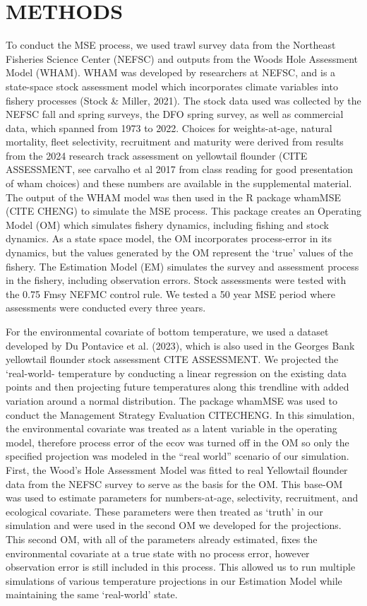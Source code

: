 \documentclass[
  12pt,
]{article}
\begin{document}
\section{METHODS}\label{methods}

To conduct the MSE process, we used trawl survey data from the Northeast Fisheries Science Center (NEFSC) and outputs from the Woods Hole Assessment Model (WHAM). WHAM was developed by researchers at NEFSC, and is a state-space stock assessment model which incorporates climate variables into fishery processes (Stock \& Miller, 2021). The stock data used was collected by the NEFSC fall and spring surveys, the DFO spring survey, as well as commercial data, which spanned from 1973 to 2022. Choices for weights-at-age, natural mortality, fleet selectivity, recruitment and maturity were derived from results from the 2024 research track assessment on yellowtail flounder (CITE ASSESSMENT, see carvalho et al 2017 from class reading for good presentation of wham choices) and these numbers are available in the supplemental material. The output of the WHAM model was then used in the R package whamMSE (CITE CHENG) to simulate the MSE process. This package creates an Operating Model (OM) which simulates fishery dynamics, including fishing and stock dynamics. As a state space model, the OM incorporates process-error in its dynamics, but the values generated by the OM represent the `true' values of the fishery. The Estimation Model (EM) simulates the survey and assessment process in the fishery, including observation errors. Stock assessments were tested with the 0.75 Fmsy NEFMC control rule. We tested a 50 year MSE period where assessments were conducted every three years.

For the environmental covariate of bottom temperature, we used a dataset developed by Du Pontavice et al. (2023), which is also used in the Georges Bank yellowtail flounder stock assessment CITE ASSESSMENT. We projected the `real-world- temperature by conducting a linear regression on the existing data points and then projecting future temperatures along this trendline with added variation around a normal distribution. The package whamMSE was used to conduct the Management Strategy Evaluation CITECHENG. In this simulation, the environmental covariate was treated as a latent variable in the operating model, therefore process error of the ecov was turned off in the OM so only the specified projection was modeled in the ``real world'' scenario of our simulation. First, the Wood's Hole Assessment Model was fitted to real Yellowtail flounder data from the NEFSC survey to serve as the basis for the OM. This base-OM was used to estimate parameters for numbers-at-age, selectivity, recruitment, and ecological covariate. These parameters were then treated as `truth' in our simulation and were used in the second OM we developed for the projections. This second OM, with all of the parameters already estimated, fixes the environmental covariate at a true state with no process error, however observation error is still included in this process. This allowed us to run multiple simulations of various temperature projections in our Estimation Model while maintaining the same `real-world' state.
\end{document}
